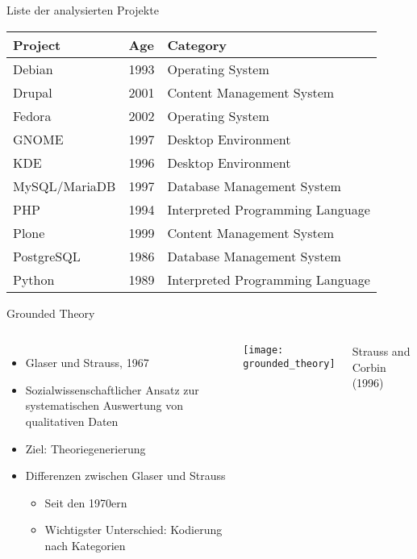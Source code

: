 \documentclass[11pt]{beamer}
\newcommand{\tableheadline}[1]{#1}
\newlength{\colwidth}
\begin{document}
\begin{frame}[t]{Liste der analysierten Projekte}
  \begin{center}
  \begin{tabularx}{\textwidth}{llX}
    \toprule
    \tableheadline{Project} & \tableheadline{Age} & \tableheadline{Category} \\
    \midrule
    Debian        & 1993 & Operating System \\
    Drupal        & 2001 & Content Management System \\
    Fedora        & 2002 & Operating System \\
    GNOME         & 1997 & Desktop Environment \\
    KDE           & 1996 & Desktop Environment \\
    MySQL/MariaDB & 1997 & Database Management System \\
    PHP           & 1994 & Interpreted Programming Language \\
    Plone         & 1999 & Content Management System \\
    PostgreSQL    & 1986 & Database Management System \\
    Python        & 1989 & Interpreted Programming Language \\
    \bottomrule
  \end{tabularx}

  \end{center}
\end{frame}

\begin{frame}[t]{Grounded Theory}
  \begin{columns}[T]
  \column{\colwidth}
    \begin{itemize}
      \item Glaser und Strauss, 1967
      \item Sozialwissenschaftlicher Ansatz zur systematischen Auswertung von qualitativen Daten
      \item Ziel: Theoriegenerierung
      \item Differenzen zwischen Glaser und Strauss
      \begin{itemize}
          \item Seit den 1970ern
          \item Wichtigster Unterschied: Kodierung nach Kategorien
      \end{itemize}
    \end{itemize}
  \column{\colwidth}
    \texttt{[image: grounded\_theory]}

    {\tiny\hfill
    Strauss and Corbin (1996)
    }
  \end{columns}
\end{frame}
\end{document}
